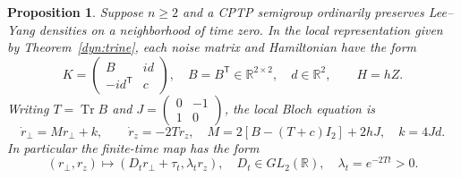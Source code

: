 \documentclass[reqno]{amsart}
\newtheorem{proposition}[theorem]{Proposition}
\theoremstyle{definition}
\theoremstyle{remark}
\newcommand{\R}{\mathbb R}
\DeclareMathOperator{\Tr}{Tr}
\begin{document}
\begin{proposition}\label{dyn:local-reality}
Suppose $n\ge2$ and a CPTP semigroup ordinarily preserves Lee--Yang
densities on a neighborhood of time zero.  In the local representation
given by Theorem~\ref{dyn:trine}, each noise matrix and Hamiltonian have
the form
\begin{equation}\label{dyn:real-local-shape}
 K=\begin{pmatrix}B&i d\\-i d^{\mathsf T}&c\end{pmatrix},
 \quad B=B^{\mathsf T}\in\R^{2\times2},\quad d\in\R^2,
 \qquad H=hZ.
\end{equation}
Writing $T=\Tr B$ and $J=\left(\begin{smallmatrix}0&-1\\1&0\end{smallmatrix}\right)$,
the local Bloch equation is
\begin{equation}\label{dyn:bloch}
 \dot r_\perp=M r_\perp+k,\qquad \dot r_z=-2T r_z,
 \quad M=2[B-(T+c)I_2]+2hJ,
 \quad k=4Jd.
\end{equation}
In particular the finite-time map has the form
\begin{equation}\label{dyn:affine}
 (r_\perp,r_z)\longmapsto(D_t r_\perp+\tau_t,\lambda_t r_z),
 \quad D_t\in GL_2(\R),\quad \lambda_t=e^{-2Tt}>0.
\end{equation}
\end{proposition}
\end{document}
